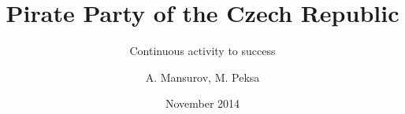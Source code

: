 \documentclass{beamer}
\begin{document}
\title{Pirate Party of the Czech Republic}
\subtitle{Continuous activity to success}
\author{A. Mansurov, M. Peksa}
\date{November 2014}
	\frame{\titlepage}
	
	
\end{document}
